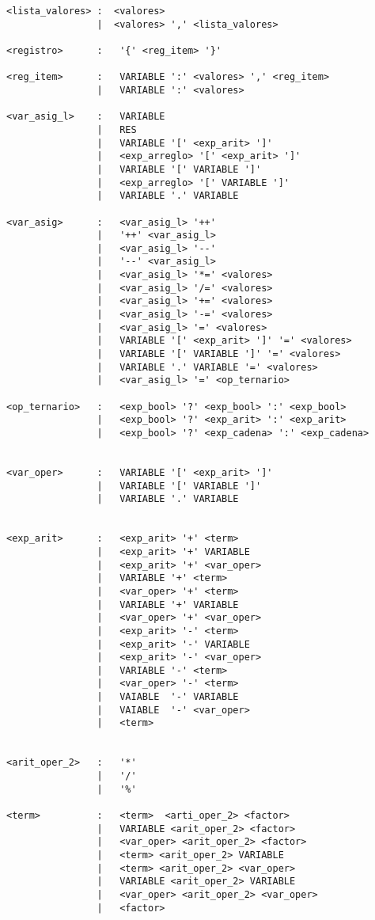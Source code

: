 \begin{verbatim}
<lista_valores> :  <valores>
                |  <valores> ',' <lista_valores>

<registro>      :   '{' <reg_item> '}'

<reg_item>      :   VARIABLE ':' <valores> ',' <reg_item>
                |   VARIABLE ':' <valores> 

<var_asig_l>    :   VARIABLE
                |   RES
                |   VARIABLE '[' <exp_arit> ']' 
                |   <exp_arreglo> '[' <exp_arit> ']' 
                |   VARIABLE '[' VARIABLE ']' 
                |   <exp_arreglo> '[' VARIABLE ']' 
                |   VARIABLE '.' VARIABLE 

<var_asig>      :   <var_asig_l> '++'
                |   '++' <var_asig_l>
                |   <var_asig_l> '--'
                |   '--' <var_asig_l>
                |   <var_asig_l> '*=' <valores>
                |   <var_asig_l> '/=' <valores>
                |   <var_asig_l> '+=' <valores>
                |   <var_asig_l> '-=' <valores>
                |   <var_asig_l> '=' <valores>
                |   VARIABLE '[' <exp_arit> ']' '=' <valores>
                |   VARIABLE '[' VARIABLE ']' '=' <valores>
                |   VARIABLE '.' VARIABLE '=' <valores>
                |   <var_asig_l> '=' <op_ternario>

<op_ternario>   :   <exp_bool> '?' <exp_bool> ':' <exp_bool>
                |   <exp_bool> '?' <exp_arit> ':' <exp_arit>
                |   <exp_bool> '?' <exp_cadena> ':' <exp_cadena>


<var_oper>      :   VARIABLE '[' <exp_arit> ']' 
                |   VARIABLE '[' VARIABLE ']' 
                |   VARIABLE '.' VARIABLE 

 
<exp_arit>      :   <exp_arit> '+' <term>
                |   <exp_arit> '+' VARIABLE
                |   <exp_arit> '+' <var_oper>
                |   VARIABLE '+' <term>
                |   <var_oper> '+' <term>
                |   VARIABLE '+' VARIABLE
                |   <var_oper> '+' <var_oper>
                |   <exp_arit> '-' <term>
                |   <exp_arit> '-' VARIABLE
                |   <exp_arit> '-' <var_oper>
                |   VARIABLE '-' <term>
                |   <var_oper> '-' <term>
                |   VAIABLE  '-' VARIABLE
                |   VAIABLE  '-' <var_oper>
                |   <term>


<arit_oper_2>   :   '*'
                |   '/'
                |   '%'

<term>          :   <term>  <arti_oper_2> <factor>
                |   VARIABLE <arit_oper_2> <factor>
                |   <var_oper> <arit_oper_2> <factor>
                |   <term> <arit_oper_2> VARIABLE
                |   <term> <arit_oper_2> <var_oper>
                |   VARIABLE <arit_oper_2> VARIABLE
                |   <var_oper> <arit_oper_2> <var_oper> 
                |   <factor>


\end{verbatim}
